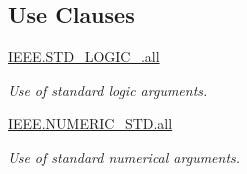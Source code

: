 \subsection*{Use Clauses}
 \begin{DoxyCompactItemize}
\item 
\hypertarget{classseven__seg__control_a68c233289eaf7d2601307bdd93b4c299}{\hyperlink{classseven__seg__control_a68c233289eaf7d2601307bdd93b4c299}{I\-E\-E\-E.\-S\-T\-D\-\_\-\-L\-O\-G\-I\-C\-\_.\-all}   }\label{classseven__seg__control_a68c233289eaf7d2601307bdd93b4c299}

\begin{DoxyCompactList}\small\item\em Use of standard logic arguments. \end{DoxyCompactList}\item 
\hypertarget{classseven__seg__control_a7c135c43c66ccd7f22abe5f6211788a5}{\hyperlink{classseven__seg__control_a7c135c43c66ccd7f22abe5f6211788a5}{I\-E\-E\-E.\-N\-U\-M\-E\-R\-I\-C\-\_\-\-S\-T\-D.\-all}   }\label{classseven__seg__control_a7c135c43c66ccd7f22abe5f6211788a5}

\begin{DoxyCompactList}\small\item\em Use of standard numerical arguments. \end{DoxyCompactList}\end{DoxyCompactItemize}

